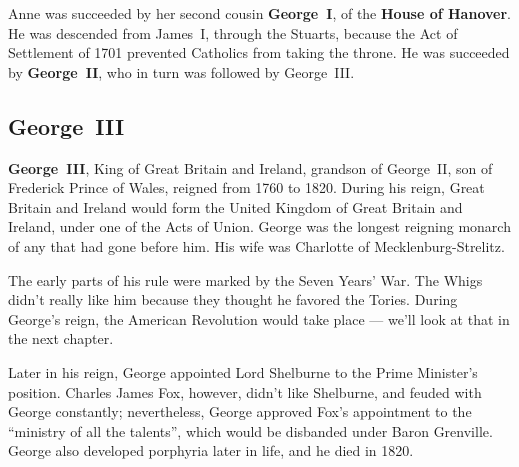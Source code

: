Anne was succeeded by her second cousin \textbf{George~I}, of the \textbf{House of Hanover}.
He was descended from James~I, through the Stuarts,
because the Act of Settlement of 1701 prevented Catholics from taking the throne.
He was succeeded by \textbf{George~II}, who in turn was followed by George~III\@.


\subsection*{George~III}

\textbf{George~III}, King of Great Britain and Ireland, grandson of George~II, son of Frederick Prince of Wales,
reigned from 1760 to 1820.
During his reign, Great Britain and Ireland would form the United Kingdom of Great Britain and Ireland,
under one of the Acts of Union.
George was the longest reigning monarch of any that had gone before him.
His wife was Charlotte of Mecklenburg-Strelitz.

The early parts of his rule were marked by the Seven Years' War.
The Whigs didn't really like him because they thought he favored the Tories.
During George's reign, the American Revolution would take place --- we'll look at that in the next chapter.

Later in his reign, George appointed Lord Shelburne to the Prime Minister's position.
Charles James Fox, however, didn't like Shelburne, and feuded with George constantly;
nevertheless, George approved Fox's appointment to the ``ministry of all the talents'',
which would be disbanded under Baron Grenville.
George also developed porphyria later in life, and he died in 1820.

